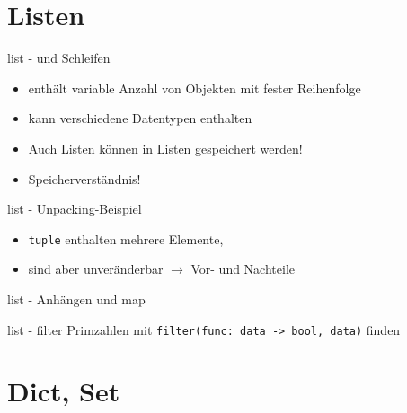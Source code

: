\section{Listen}

\begin{frame}{list - und Schleifen}
	
	\begin{itemize}
		\item enthält variable Anzahl von Objekten mit fester Reihenfolge
		\item kann verschiedene Datentypen enthalten
		\item Auch Listen können in Listen gespeichert werden!
		\item Speicherverständnis!
	\end{itemize}
\end{frame}
\begin{frame}{list - Unpacking-Beispiel}
	
	\begin{itemize}
		\item {\tt tuple} enthalten mehrere Elemente,
		\item sind aber unveränderbar $\to$ Vor- und Nachteile
	\end{itemize}
\end{frame}
\begin{frame}{list - Anhängen und map}
	\onslide<1->
	\onslide<2->
\end{frame}
\begin{frame}{list - filter}
	Primzahlen mit {\tt filter(func: data -> bool, data)} finden
	\onslide<2->
\end{frame}


\section{Dict, Set}

